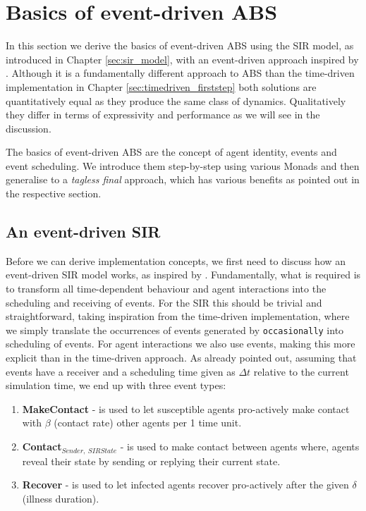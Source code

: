 \section{Basics of event-driven ABS}
\label{sec:eventdriven_basics}
In this section we derive the basics of event-driven ABS using the SIR model, as introduced in Chapter \ref{sec:sir_model}, with an event-driven approach inspired by \cite{macal_agent-based_2010}. Although it is a fundamentally different approach to ABS than the time-driven implementation in Chapter \ref{sec:timedriven_firststep} both solutions are quantitatively equal as they produce the same class of dynamics. Qualitatively they differ in terms of expressivity and performance as we will see in the discussion.

The basics of event-driven ABS are the concept of agent identity, events and event scheduling. We introduce them step-by-step using various Monads and then generalise to a \textit{tagless final} approach, which has various benefits as pointed out in the respective section. 

\subsection{An event-driven SIR}
Before we can derive implementation concepts, we first need to discuss how an event-driven SIR model works, as inspired by \cite{macal_agent-based_2010}. Fundamentally, what is required is to transform all time-dependent behaviour and agent interactions into the scheduling and receiving of events. For the SIR this should be trivial and straightforward, taking inspiration from the time-driven implementation, where we simply translate the occurrences of events generated by \texttt{occasionally} into scheduling of events. For agent interactions we also use events, making this more explicit than in the time-driven approach. As already pointed out, assuming that events have a receiver and a scheduling time given as $\Delta t$ relative to the current simulation time, we end up with three event types:

\begin{enumerate}
	\item \textbf{MakeContact} - is used to let susceptible agents pro-actively make contact with $\beta$ (contact rate) other agents per 1 time unit.
	\item \textbf{Contact$_{Sender, \ SIRState}$} - is used to make contact between agents where, agents reveal their state by sending or replying their current state.
	\item \textbf{Recover} - is used to let infected agents recover pro-actively after the given $\delta$ (illness duration). 
\end{enumerate}

